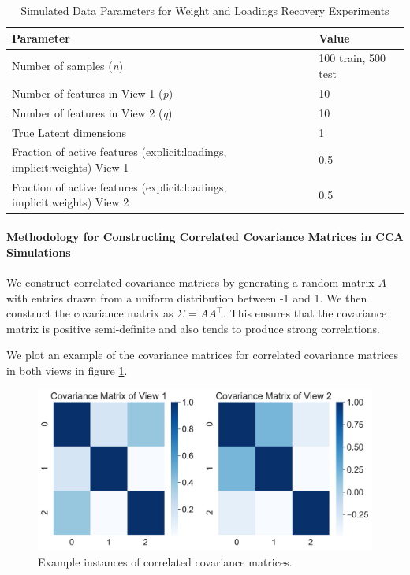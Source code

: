 \begin{table}
    \centering
    \caption{Simulated Data Parameters for Weight and Loadings Recovery Experiments}
    \begin{tabular}{| l | l |}
        \hline
        \textbf{Parameter}                        & \textbf{Value}                               \\
        \hline
        Number of samples (\textit{n})            & 100 train, 500 test                            \\
        Number of features in View 1 (\textit{p}) & 10 \\
        Number of features in View 2 (\textit{q}) & 10 \\
        True Latent dimensions                    & 1                                            \\
        Fraction of active features (explicit:loadings, implicit:weights) View 1            & 0.5                                          \\
        Fraction of active features (explicit:loadings, implicit:weights) View 2            & 0.5                                          \\
        \hline
    \end{tabular}\label{tab:simulated-data-parameters}
\end{table}

\paragraph{Methodology for Constructing Correlated Covariance Matrices in CCA Simulations}

We construct correlated covariance matrices by generating a random matrix $A$ with entries drawn from a uniform distribution between -1 and 1.
We then construct the covariance matrix as $\Sigma = AA^\top$.
This ensures that the covariance matrix is positive semi-definite and also tends to produce strong correlations.

We plot an example of the covariance matrices for correlated covariance matrices in both views in figure \ref{fig:covariance-matrices}.

 \begin{figure}
     \centering
     \includegraphics[width=0.8\linewidth]{figures/simulated/explicit/True_Covariance_Correlated.pdf}
     \caption{Example instances of correlated covariance matrices.}\label{fig:covariance-matrices}
 \end{figure}

